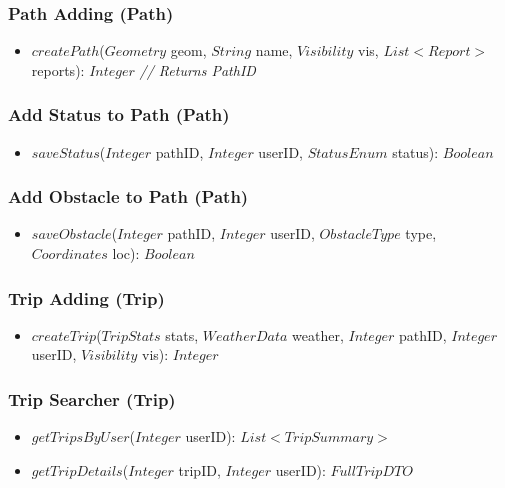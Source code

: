 \subsubsection*{Path Adding (Path)}
\begin{itemize}
    \item $createPath$($Geometry$ geom, $String$ name, $Visibility$ vis, $List<Report>$ reports): $Integer$ \textit{// Returns PathID}
\end{itemize}

\subsubsection*{Add Status to Path (Path)}
\begin{itemize}
    \item $saveStatus$($Integer$ pathID, $Integer$ userID, $StatusEnum$ status): $Boolean$
\end{itemize}

\subsubsection*{Add Obstacle to Path (Path)}
\begin{itemize}
    \item $saveObstacle$($Integer$ pathID, $Integer$ userID, $ObstacleType$ type, $Coordinates$ loc): $Boolean$
\end{itemize}

\subsubsection*{Trip Adding (Trip)}
\begin{itemize}
    \item $createTrip$($TripStats$ stats, $WeatherData$ weather, $Integer$ pathID, $Integer$ userID, $Visibility$ vis): $Integer$
\end{itemize}

\subsubsection*{Trip Searcher (Trip)}
\begin{itemize}
    \item $getTripsByUser$($Integer$ userID): $List<TripSummary>$
    \item $getTripDetails$($Integer$ tripID, $Integer$ userID): $FullTripDTO$
\end{itemize}

